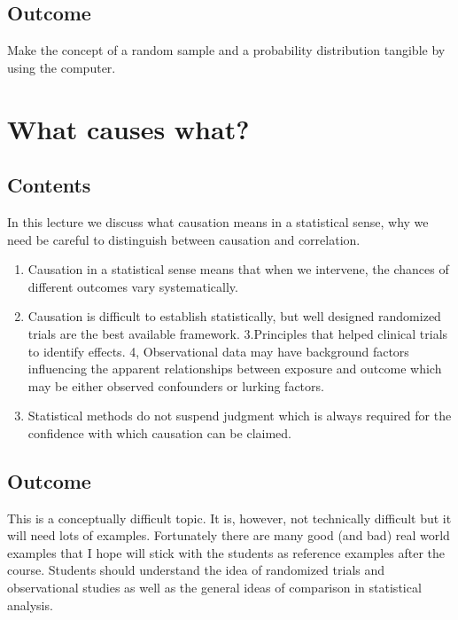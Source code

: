 \documentclass[
  letterpaper,
]{scrbook}
\providecommand{\tightlist}{%
  \setlength{\itemsep}{0pt}\setlength{\parskip}{0pt}}\usepackage{longtable,booktabs,array}
\begin{document}
\hypertarget{outcome-2}{%
\section{Outcome}\label{outcome-2}}

Make the concept of a random sample and a probability distribution
tangible by using the computer.


\hypertarget{what-causes-what}{%
\chapter{What causes what?}\label{what-causes-what}}

\hypertarget{contents-3}{%
\section{Contents}\label{contents-3}}

In this lecture we discuss what causation means in a statistical sense,
why we need be careful to distinguish between causation and correlation.

\begin{enumerate}
\def\labelenumi{\arabic{enumi}.}
\tightlist
\item
  Causation in a statistical sense means that when we intervene, the
  chances of different outcomes vary systematically.
\item
  Causation is difficult to establish statistically, but well designed
  randomized trials are the best available framework. 3.Principles that
  helped clinical trials to identify effects. 4, Observational data may
  have background factors influencing the apparent relationships between
  exposure and outcome which may be either observed confounders or
  lurking factors.
\item
  Statistical methods do not suspend judgment which is always required
  for the confidence with which causation can be claimed.
\end{enumerate}

\hypertarget{outcome-3}{%
\section{Outcome}\label{outcome-3}}

This is a conceptually difficult topic. It is, however, not technically
difficult but it will need lots of examples. Fortunately there are many
good (and bad) real world examples that I hope will stick with the
students as reference examples after the course. Students should
understand the idea of randomized trials and observational studies as
well as the general ideas of comparison in statistical analysis.
\end{document}
